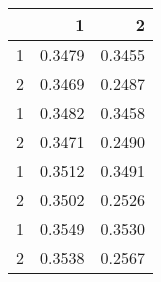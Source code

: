 \begin{tabular}{lrr}
\toprule
{} &       1 &       2 \\
\midrule
1 &  0.3479 &  0.3455 \\
2 &  0.3469 &  0.2487 \\
1 &  0.3482 &  0.3458 \\
2 &  0.3471 &  0.2490 \\
1 &  0.3512 &  0.3491 \\
2 &  0.3502 &  0.2526 \\
1 &  0.3549 &  0.3530 \\
2 &  0.3538 &  0.2567 \\
\bottomrule
\end{tabular}
